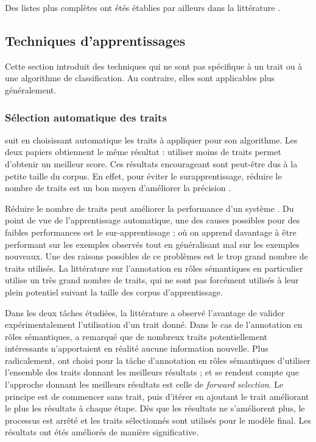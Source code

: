 Des listes plus complètes ont étés établies par ailleurs dans la littérature \citep{pradhan2005semantic,marquez2008semantic,palmer2010semantic}.

\subsection{Techniques d'apprentissages}

Cette section introduit des techniques qui ne sont pas spécifique à un trait ou à une algorithme de classification. Au contraire, elles sont applicables plus généralement.

\subsubsection{Sélection automatique des traits}

\cite{dinu2007sometimes} suit \cite{mihalcea2002instance} en choisissant automatique les traits à appliquer pour son algorithme. Les deux papiers obtiennent le même résultat : utiliser moins de traits permet d'obtenir un meilleur score. Ces résultats encourageant sont peut-être dus à la petite taille du corpus. En effet, pour éviter le surapprentissage, réduire le nombre de traits est un bon moyen d'améliorer la précision \citep{van2004bias}.


Réduire le nombre de traits peut améliorer la performance d'un système \cite{mihalcea2002instance,dinu2007sometimes}. Du point de vue de l'apprentissage automatique, une des causes possibles pour des faibles performances est le sur-apprentissage ; où on apprend davantage à être performant sur les exemples observés tout en généralisant mal sur les exemples nouveaux. Une des raisons possibles de ce problèmes est le trop grand nombre de traits utilisés. La littérature sur l'annotation en rôles sémantiques en particulier utilise un très grand nombre de traits, qui ne sont pas forcément utilisés à leur plein potentiel suivant la taille des corpus d'apprentissage.

Dans les deux tâches étudiées, la littérature a observé l'avantage de valider expérimentalement l'utilisation d'un trait donné. Dans le cas de l'annotation en rôles sémantiques, \cite{ololol} a remarqué que de nombreux traits potentiellement intéressants n'apportaient en réalité aucune information nouvelle. Plus radicalement, \cite{mihalcea2002instance,dinu2007sometimes} ont choisi pour la tâche d'annotation en rôles sémantiques d'utiliser l'ensemble des traits donnant les meilleurs résultats ; et se rendent compte que l'approche donnant les meilleurs résultats est celle de \textit{forward selection}. Le principe est de commencer sans trait, puis d'itérer en ajoutant le trait améliorant le plus les résultats à chaque étape. Dès que les résultats ne s'améliorent plus, le processus est arrêté et les traits sélectionnés sont utilisés pour le modèle final. Les résultats ont étés améliorés de manière significative.

